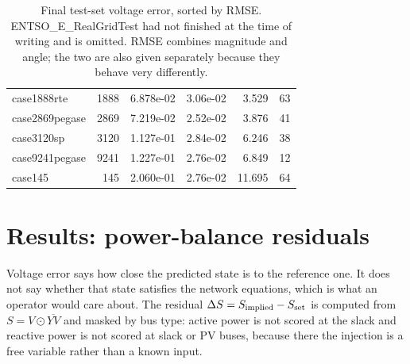 \documentclass[10pt]{article}
\begin{document}
\begin{table}[H]
\begin{tabular}{lrrrrr}
case1888rte & 1888 & 6.878e-02 & 3.06e-02 & 3.529 & 63 \\
case2869pegase & 2869 & 7.219e-02 & 2.52e-02 & 3.876 & 41 \\
case3120sp & 3120 & 1.127e-01 & 2.84e-02 & 6.246 & 38 \\
case9241pegase & 9241 & 1.227e-01 & 2.76e-02 & 6.849 & 12 \\
case145 & 145 & 2.060e-01 & 2.76e-02 & 11.695 & 64 \\
\bottomrule
\end{tabular}
\caption{Final test-set voltage error, sorted by RMSE. ENTSO\_E\_RealGridTest
had not finished at the time of writing and is omitted. RMSE combines magnitude
and angle; the two are also given separately because they behave very
differently.}
\end{table}

\section{Results: power-balance residuals}

Voltage error says how close the predicted state is to the reference one. It
does not say whether that state satisfies the network equations, which is what
an operator would care about. The residual
$\Delta S = S_{\rm implied} - S_{\rm set}$ is computed from
$S = V\odot\overline{YV}$ and masked by bus type: active power is not scored at
the slack and reactive power is not scored at slack or PV buses, because there
the injection is a free variable rather than a known input.
\end{document}

